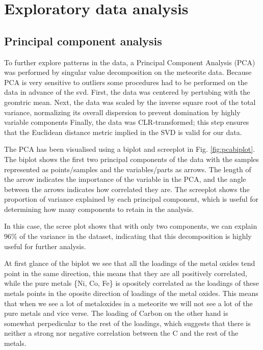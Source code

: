 \section{Exploratory data analysis}

\subsection{Principal component analysis }

To further explore patterns in the data, a Principal Component Analysis (PCA) was performed by singular value decomposition on the meteorite data.
Because PCA is very sensitive to outliers some procedures had to be performed on the data in advance of the svd. First,
the data was centered by pertubing with the geomtric mean. Next, the data was scaled by the inverse square 
root of the total variance, normalizing its overall dispersion to prevent domination by highly variable components Finally, 
the data was CLR-transformed; this step ensures that the Euclidean distance metric implied in the SVD is valid for our data.  

The PCA has been visualised using a biplot and screeplot in Fig. \ref{fig:pcabiplot}. The biplot shows the first two principal components of the data with the samples
represented as points/samples and the variables/parts as arrows. The length of the arrow indicates the importance of the variable in the PCA, and the angle between the arrows indicates how correlated they are.
The screeplot shows the proportion of variance explained by each principal component, which is useful for determining how many components to retain in the analysis. 

In this case, the scree plot shows that with only two components, we can explain 96\% of the variance in the dataset, indicating that this decomposition is highly useful for further analysis.

At first glance of the biplot we see that all the loadings of the metal oxides tend point in the same direction, this means that they are all positively correlated, while the pure metals \{Ni, Co, Fe\} is opositely correlated as the loadings of these metals points in the oposite direction of loadings of the metal oxides. This means that when we see a lot of metaloxides in a meteorite we will not see a lot of the pure metals and vice verse. The loading of Carbon on the other hand is somewhat 
perpedicular to the rest of the loadings, which suggests that there is neither a strong nor negative correlation between the 
C and the rest of the metals. 


